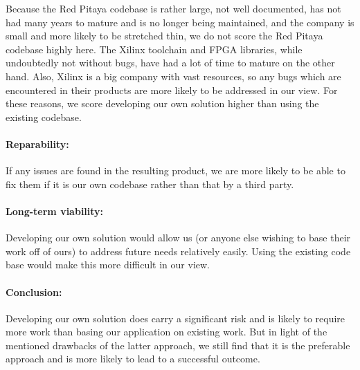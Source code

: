 Because the Red Pitaya codebase is  rather large, not well documented, has not
had many years to mature and is no longer being maintained, and the company is
small  and  more  likely to  be  stretched  thin,  we  do not  score  the  Red
Pitaya codebase  highly here. The Xilinx  toolchain and FPGA  libraries, while
undoubtedly not without  bugs, have had a  lot of time to mature  on the other
hand.  Also, Xilinx  is a big company  with vast resources, so  any bugs which
are  encountered in  their products  are more  likely to  be addressed  in our
view. For  these reasons,  we score  developing our  own solution  higher than
using the existing codebase.

\paragraph{Reparability:} If any issues are found in the resulting product, we
are more likely to  be able to fix them if it is  our own codebase rather than
that by a third party.

\paragraph{Long-term viability:} Developing  our own  solution would  allow us
(or anyone  else wishing  to base their  work off of  ours) to  address future
needs relatively  easily. Using the  existing code base  would make  this more
difficult in our view.

\paragraph{Conclusion:} Developing our  own solution does carry  a significant
risk  and is  likely  to require  more  work than  basing  our application  on
existing  work.   But in  light  of  the  mentioned  drawbacks of  the  latter
approach, we still find that it is  the preferable approach and is more likely
to lead to a successful outcome.


